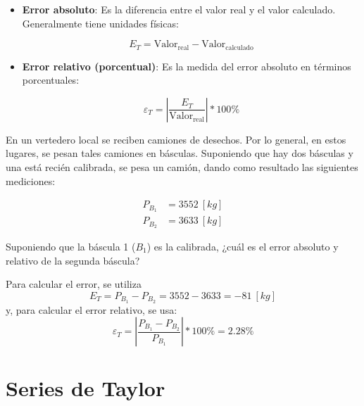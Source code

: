 \begin{itemize}
    \item
        \textbf{Error absoluto}: Es la diferencia entre el valor real y el
        valor calculado. Generalmente tiene unidades físicas:

        \begin{equation*}{
                E_T = \text{Valor}_{\text{real}} - \text{Valor}_{\text{calculado}}
        }\end{equation*}
    \item
        \textbf{Error relativo (porcentual)}: Es la medida del error absoluto
        en términos porcentuales:

        \begin{equation*}{
                \varepsilon_{T} = \left| {\frac{E_T}{\text{Valor}_{\text{real}}}} \right| * 100 \%
        }\end{equation*}
\end{itemize}


\begin{ex}

    En un vertedero local se reciben camiones de desechos. Por lo general,
    en estos lugares, se pesan tales camiones en básculas. Suponiendo que
    hay dos básculas y una está recién calibrada, se pesa un camión, dando
    como resultado las siguientes mediciones:

    \begin{eqnarray*}
        P_{B_1} &= 3552\ [\si{kg}] \\
        P_{B_2} &= 3633\ [\si{kg}]
    \end{eqnarray*}

    Suponiendo que la báscula 1 (\(B_1\)) es la calibrada, ¿cuál es el error
    absoluto y relativo de la segunda báscula?

    \begin{solution}
        Para calcular el error, se utiliza
        \[
            E_T = P_{B_1} - P_{B_2} = 3552 - 3633 = -81\ [\si{kg}]
        \]
        y, para calcular el error relativo, se usa:
        \[
            \boxed{\varepsilon_T = \left| \frac{P_{B_1} - P_{B_2}}{P_{B_1}} \right| * 100\% = 2.28\%}
        \]

    \end{solution}


\end{ex}


\section{Series de Taylor}

